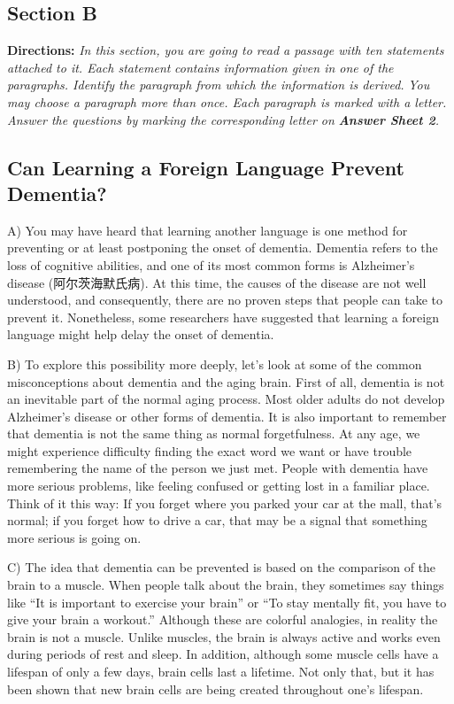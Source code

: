 \documentclass[UTF8,11pt]{ctexart}
\begin{document}
\subsection*{\textbf{Section B}}


\textbf{Directions:} \textit{In this section, you are going to read a passage with ten statements attached to it. Each statement} \textit{contains information given in one of the paragraphs. Identify the paragraph from which the information is derived.} \textit{You may choose a paragraph more than once. Each paragraph is marked with a letter. Answer the questions by} \textit{marking the corresponding letter on }\textbf{\textit{Answer Sheet 2}}\textit{.}


\subsection*{\textbf{Can Learning a Foreign Language Prevent Dementia?}}


A) You may have heard that learning another language is one method for preventing or at least postponing the onset of dementia. Dementia refers to the loss of cognitive abilities, and one of its most common forms is Alzheimer’s disease (阿尔茨海默氏病). At this time, the causes of the disease are not well understood, and consequently, there are no proven steps that people can take to prevent it. Nonetheless, some researchers have suggested that learning a foreign language might help delay the onset of dementia.


B) To explore this possibility more deeply, let’s look at some of the common misconceptions about dementia and the aging brain. First of all, dementia is not an inevitable part of the normal aging process. Most older adults do not develop Alzheimer’s disease or other forms of dementia. It is also important to remember that dementia is not the same thing as normal forgetfulness. At any age, we might experience difficulty finding the exact word we want or have trouble remembering the name of the person we just met. People with dementia have more serious problems, like feeling confused or getting lost in a familiar place. Think of it this way: If you forget where you parked your car at the mall, that’s normal; if you forget how to drive a car, that may be a signal that something more serious is going on.


C) The idea that dementia can be prevented is based on the comparison of the brain to a muscle. When people talk about the brain, they sometimes say things like “It is important to exercise your brain” or “To stay mentally fit, you have to give your brain a workout.” Although these are colorful analogies, in reality the brain is not a muscle. Unlike muscles, the brain is always active and works even during periods of rest and sleep. In addition, although some muscle cells have a lifespan of only a few days, brain cells last a lifetime. Not only that, but it has been shown that new brain cells are being created throughout one’s lifespan.
\end{document}
